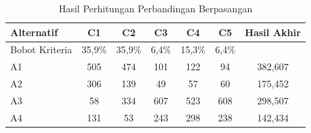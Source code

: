\begin{table}[H]
	\centering
	\caption{Hasil Perhitungan Perbandingan Berpasangan}
	\label{tab:hasil_perhitungan}
	\begin{tabular}{|l|c|c|c|c|c|c|}
		\hline
		Alternatif & C1 & C2 & C3 & C4 & C5 & Hasil Akhir \\ \hline
		Bobot Kriteria & 35,9\% & 35,9\% & 6,4\% & 15,3\% & 6,4\% & \\ \hline
		A1 & 505 & 474 & 101 & 122 & 94 & 382,607 \\ \hline
		A2 & 306 & 139 & 49 & 57 & 60 & 175,452 \\ \hline
		A3 & 58 & 334 & 607 & 523 & 608 & 298,507 \\ \hline
		A4 & 131 & 53 & 243 & 298 & 238 & 142,434 \\ \hline
	\end{tabular}
\end{table}